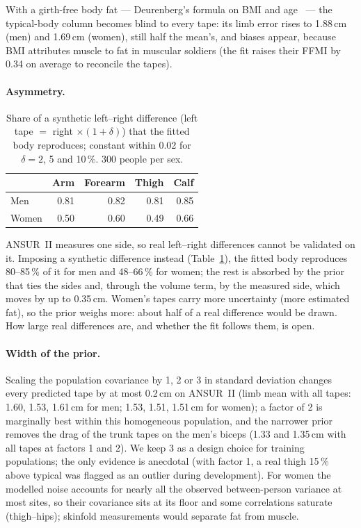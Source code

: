 \documentclass[10pt,twocolumn]{article}
\begin{document}
With a girth-free body fat --- Deurenberg's formula on BMI and age~\cite{deurenberg1991bmi} --- the
typical-body column becomes blind to every tape: its limb error rises to 1.88\,cm (men) and 1.69\,cm
(women), still half the mean's, and biases appear, because BMI attributes muscle to fat in muscular
soldiers (the fit raises their FFMI by 0.34 on average to reconcile the tapes).

\paragraph{Asymmetry.}
\begin{table}[t]
\centering\small
\caption{Share of a synthetic left--right difference (left tape $=$ right $\times(1+\delta)$) that the
fitted body reproduces; constant within 0.02 for $\delta=2$, 5 and 10\,\%. 300 people per sex.}
\label{tab:asym}
\begin{tabular}{@{}lrrrr@{}}
\toprule
 & Arm & Forearm & Thigh & Calf\\
\midrule
Men   & 0.81 & 0.82 & 0.81 & 0.85\\
Women & 0.50 & 0.60 & 0.49 & 0.66\\
\bottomrule
\end{tabular}
\end{table}
ANSUR~II measures one side, so real left--right differences cannot be validated on it. Imposing a
synthetic difference instead (Table~\ref{tab:asym}), the fitted body reproduces 80--85\,\% of it for
men and 48--66\,\% for women; the rest is absorbed by the prior that ties the sides and, through the
volume term, by the measured side, which moves by up to 0.35\,cm. Women's tapes carry more
uncertainty (more estimated fat), so the prior weighs more: about half of a real difference would be
drawn. How large real differences are, and whether the fit follows them, is open.

\paragraph{Width of the prior.}
Scaling the population covariance by 1, 2 or 3 in standard deviation changes every predicted tape by at
most 0.2\,cm on ANSUR~II (limb mean with all tapes: 1.60, 1.53, 1.61\,cm for men; 1.53, 1.51,
1.51\,cm for women); a factor of 2 is marginally best within this homogeneous population, and the
narrower prior removes the drag of the trunk tapes on the men's biceps (1.33 and 1.35\,cm with all
tapes at factors 1 and 2). We keep 3 as
a design choice for training populations; the only evidence is anecdotal (with factor 1, a real
thigh 15\,\% above typical was flagged as an outlier during development). For women the modelled
noise accounts for nearly all the observed between-person variance at most sites, so their covariance
sits at its floor and some correlations saturate (thigh--hips); skinfold measurements would separate
fat from muscle.
\end{document}

